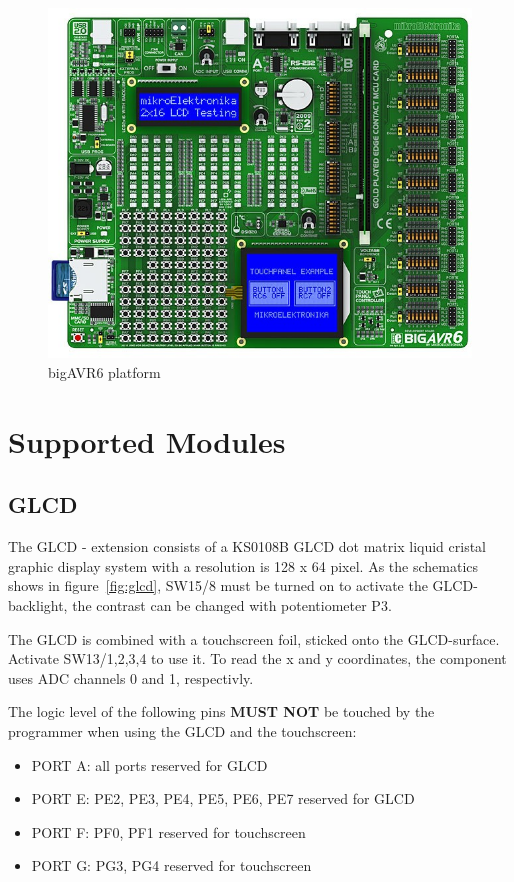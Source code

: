 \begin{figure}[h]
 \centerline{\includegraphics[width=.5\columnwidth]{pics/bigavr6.png}}
  \caption{bigAVR6 platform}
  \label{fig:bigavr6}
\end{figure}


\section{Supported Modules}

\subsection{GLCD}

The GLCD - extension consists of a KS0108B GLCD dot matrix liquid cristal graphic display system with a resolution is 128 x 64 pixel. As the schematics shows in figure~\ref{fig:glcd}, SW15/8 must be turned on to activate the GLCD-backlight, the contrast can be changed with potentiometer P3.

The GLCD is combined with a touchscreen foil, sticked onto the GLCD-surface. Activate SW13/1,2,3,4 to use it. To read the x and y coordinates, the component uses ADC channels 0 and 1, respectivly. 

The logic level of the following pins \textbf{MUST NOT} be touched by the programmer when using the GLCD and the touchscreen:

\begin{itemize}
 \item PORT A: 					all ports reserved for GLCD
 \item PORT E: PE2, PE3, PE4, PE5, PE6, PE7	reserved for GLCD
 \item PORT F: PF0, PF1 			reserved for touchscreen
 \item PORT G: PG3, PG4				reserved for touchscreen
\end{itemize}


